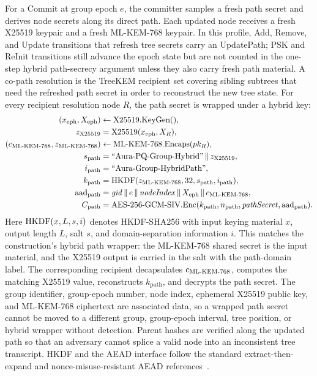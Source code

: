 \documentclass[preprint,12pt]{elsarticle}
\theoremstyle{definition}
\newcommand{\tech}[1]{\textnormal{#1}}
\newcommand{\domain}[1]{\textnormal{``#1''}}
\renewcommand{\mathsf}[1]{\mathrm{#1}}
\newcommand{\HKDF}{\tech{HKDF}}
\newcommand{\AEAD}{\tech{AES-256-GCM-SIV}}
\renewcommand{\DH}{\tech{X25519}}
\newcommand{\KEM}{\tech{ML-KEM-768}}
\newcommand{\Enc}{\tech{Enc}}
\newcommand{\KeyGen}{\tech{KeyGen}}
\newcommand{\Encaps}{\tech{Encaps}}
\newcommand{\concat}{\,\|\,}
\newcommand{\gid}{\mathit{gid}}
\begin{document}
For a Commit at group epoch $e$, the committer samples a fresh path secret and
derives node secrets along its direct path. Each updated node receives a fresh
\DH{} keypair and a fresh \KEM{} keypair. In this profile, Add, Remove, and
Update transitions that refresh tree secrets carry an UpdatePath; PSK and
ReInit transitions still advance the epoch state but are not counted in the
one-step hybrid path-secrecy argument unless they also carry fresh path
material. A co-path resolution is the TreeKEM recipient set covering sibling
subtrees that need the refreshed path secret in order to reconstruct the new
tree state. For every recipient resolution node $R$, the path secret is wrapped
under a hybrid key:
\begingroup
\footnotesize
\begin{equation*}
\begin{aligned}
  (x_{\mathsf{eph}},X_{\mathsf{eph}})&\gets \DH.\KeyGen(),\\
  z_{\DH}&=\DH(x_{\mathsf{eph}},X_R),\\
  (c_{\KEM},z_{\KEM})&\gets \KEM.\Encaps(pk_R),\\
  s_{\mathsf{path}}&=\domain{Aura-PQ-Group-Hybrid}\concat z_{\DH},\\
  i_{\mathsf{path}}&=\domain{Aura-Group-HybridPath},\\
  k_{\mathsf{path}}&=\HKDF(z_{\KEM},32,s_{\mathsf{path}},i_{\mathsf{path}}),\\
  \mathsf{aad}_{\mathsf{path}}&=\gid\concat e\concat \mathit{nodeIndex}
    \concat X_{\mathsf{eph}}\concat c_{\KEM},\\
  C_{\mathsf{path}}&=\AEAD.\Enc(k_{\mathsf{path}},n_{\mathsf{path}},
    \mathit{pathSecret},\mathsf{aad}_{\mathsf{path}}).
\end{aligned}
\end{equation*}
\endgroup
Here $\HKDF(x,L,s,i)$ denotes HKDF-SHA256 with input keying material $x$,
output length $L$, salt $s$, and domain-separation information $i$. This
matches the construction's hybrid path wrapper: the \KEM{} shared secret is
the input material, and the \DH{} output is carried in the salt with the
path-domain label.
The corresponding recipient decapsulates $c_{\KEM}$, computes the matching
\DH{} value, reconstructs $k_{\mathsf{path}}$, and decrypts the path secret.
The group identifier, group-epoch number, node index, ephemeral \DH{} public key, and \KEM{}
ciphertext are associated data, so a wrapped path secret cannot be moved to a
different group, group-epoch interval, tree position, or hybrid wrapper without detection.
Parent hashes are verified along the updated path so that an adversary cannot
splice a valid node into an inconsistent tree transcript. HKDF and the AEAD
interface follow the standard extract-then-expand and nonce-misuse-resistant
AEAD references~\cite{rfc5869,rfc8452}.
\end{document}
